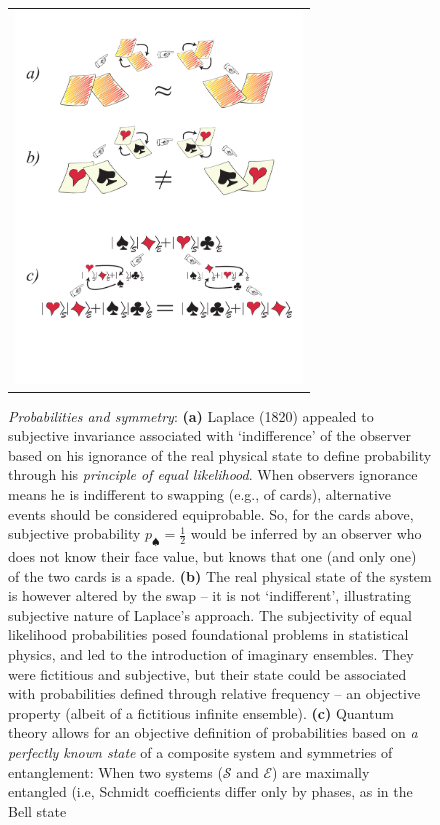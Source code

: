 \documentclass[aps,rmp,floatfix,11pt]{revtex4}
\newcommand{\cS}        {{\mathcal S}}
\newcommand{\cE}        {{\mathcal E}}
\newcommand{\+}         {\dagger}
\begin{document}
\begin{figure}[p]
\begin{tabular}{l}
\vspace{-0.15in} 
\includegraphics[width=3.0in]{allcards.pdf}\\
\end{tabular}
\caption{\footnotesize{\it Probabilities and symmetry}: 
{\bf (a)} Laplace (1820) appealed to subjective invariance associated with `indifference' of the observer based on his ignorance of the real physical state to define probability through his {\it principle of equal likelihood}. When observers ignorance means he is indifferent to swapping (e.g., of cards), alternative 
events should be considered equiprobable. So, for the cards above, subjective probability 
$p_\spadesuit ={ \frac 1 2}$ would be inferred by an observer who does not know their face value, 
but knows that one (and only one) of the two cards is a spade.
{\bf (b)} The real physical state of the system is however altered by the swap -- it is not `indifferent',
illustrating subjective nature of Laplace's approach. The subjectivity of equal likelihood probabilities 
posed foundational problems in statistical physics, and led to the introduction of imaginary ensembles. 
They were fictitious and  subjective, but their state could be associated with probabilities 
defined through relative frequency -- an objective property (albeit of a fictitious infinite ensemble).
{\bf (c)} Quantum theory allows for an objective definition of probabilities based on {\it a perfectly known state} of a composite system and symmetries of entanglement: When two systems ($\cS$ and $\cE$) 
are maximally entangled (i.e, Schmidt coefficients differ only by phases, as in the Bell state
}
\end{figure}
\end{document}
